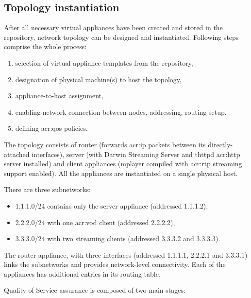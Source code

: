 \documentclass[11pt]{book}
\begin{document}
      \subsection{Topology instantiation}
      \label{ssub:}

        After all necessary virtual appliances have been created and stored in the repository, network topology can be
        designed and instantiated. Following steps comprise the whole process:

        \begin{enumerate}
          \item selection of virtual appliance templates from the repository,
          \item designation of physical machine(s) to host the topology,
          \item appliance-to-host assignment,
          \item enabling network connection between nodes, addressing, routing setup,
          \item defining \gls{acr:qos} policies.
        \end{enumerate}

        The topology consists of router (forwards \gls{acr:ip} packets between its directly-attached interfaces), server (with
        Darwin Streaming Server and thttpd \gls{acr:http} server installed) and client appliances (mplayer compiled with \gls{acr:rtp}
        streaming support enabled). All the appliances are instantiated on a single physical host.

        There are three subnetworks:

        \begin{itemize}
          \item 1.1.1.0/24 contains only the server appliance (addressed 1.1.1.2),
          \item 2.2.2.0/24 with one \gls{acr:vod} client (addressed 2.2.2.2),
          \item 3.3.3.0/24 with two streaming clients (addressed 3.3.3.2 and 3.3.3.3).
        \end{itemize}

        The router appliance, with three interfaces (addressed 1.1.1.1, 2.2.2.1 and 3.3.3.1) links the subnetworks and
        provides network-level connectivity. Each of the appliances has additional entries in its routing table.

        Quality of Service assurance is composed of two main stages:
\end{document}
